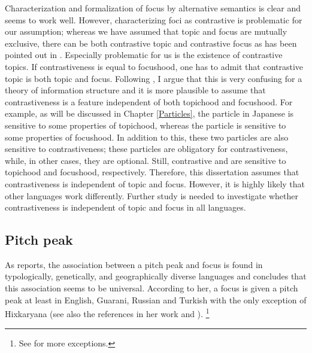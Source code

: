 Characterization and formalization of focus by alternative semantics is
clear and seems to work well.
However, characterizing foci as contrastive is problematic
for our assumption;
whereas we have assumed that topic and focus are mutually exclusive,
there can be both contrastive topic and contrastive focus
as has been pointed out in .
Especially problematic for us is the existence of contrastive topics.
If contrastiveness is equal to focushood,
one has to admit that contrastive topic is both topic and focus.
Following ,
I argue that this is very confusing for a theory of information structure and
it is more plausible to assume that contrastiveness is a feature independent of both topichood and focushood.
For example,
as will be discussed in Chapter \ref{Particles},
the particle  in Japanese is sensitive to some properties of topichood,
whereas the particle  is sensitive to some properties of focushood.
In addition to this,
these two particles are also sensitive to contrastiveness;
these particles are obligatory for contrastiveness,
while, in other cases, they are optional.
Still, contrastive  and  are sensitive to topichood and focushood, respectively.
Therefore, this dissertation
assumes that
contrastiveness is independent of topic and focus.
However, it is highly likely that other languages work differently.
Further study is needed to investigate whether contrastiveness is independent of topic and focus in all languages.

%
%
\subsection{Pitch peak}

As  reports,
the association between a pitch peak and focus
is found in typologically, genetically, and geographically diverse languages
and concludes that this association seems to be universal.
According to her,
a focus is given a pitch peak at least in English, Guarani, Russian and Turkish
with the only exception of Hixkaryana (see also the references in her work and ).%
\footnote{
See  for more exceptions.
}


